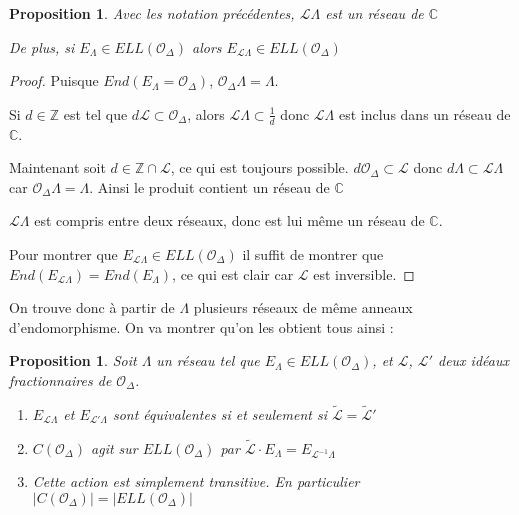 \documentclass{article}
\newcommand{\Z}[0]{\mathbb{Z}}
\newcommand{\C}[0]{\mathbb{C}}
\newcommand{\OR}[0]{\mathcal{O}}
\newcommand{\LR}[0]{\mathcal{L}}
\newcommand{\CL}[0]{\tilde{\LR}}
\newtheorem{Prop}[The]{Proposition}
\begin{document}
\begin{Prop}
	Avec les notation précédentes, $\LR\Lambda$ est un réseau de $\C$ 
	
	De plus, si $E_{\Lambda}\in ELL(\OR_{\Delta})$ alors $E_{\LR\Lambda}\in ELL(\OR_{\Delta})$
\end{Prop}

\begin{proof}
	Puisque $End(E_{\Lambda} = \OR_{\Delta})$, $\OR_{\Delta}\Lambda = \Lambda$. 
	
	Si $d\in\Z$ est tel que $d\LR\subset\OR_{\Delta}$, alors $\LR\Lambda\subset\frac{1}{d}$ donc $\LR\Lambda$ est inclus dans un réseau de $\C$. 
	
	Maintenant soit $d\in\Z\cap\LR$, ce qui est toujours possible. $d\OR_{\Delta}\subset\LR$ donc $d\Lambda\subset\LR\Lambda$ car $\OR_{\Delta}\Lambda = \Lambda$. Ainsi le produit contient un réseau de $\C$
	
	$\LR\Lambda$ est compris entre deux réseaux, donc est lui même un réseau de $\C$.
	
	Pour montrer que $E_{\LR\Lambda}\in ELL(\OR_{\Delta})$ il suffit de montrer que $End(E_{\LR\Lambda}) = End(E_{\Lambda})$, ce qui est clair car $\LR$ est inversible. 
\end{proof}

On trouve donc à partir de $\Lambda$ plusieurs réseaux de même anneaux d'endomorphisme. On va montrer qu'on les obtient tous ainsi :

\begin{Prop}
	Soit $\Lambda$ un réseau tel que $E_{\Lambda}\in ELL(\OR_{\Delta})$, et $\LR$, $\LR'$ deux idéaux fractionnaires de $\OR_{\Delta}$. 
	
	\begin{enumerate}
		\item $E_{\LR\Lambda}$ et $E_{\LR'\Lambda}$ sont équivalentes si et seulement si $\CL = \CL'$
		\item $C(\OR_{\Delta})$ agit sur $ELL(\OR_{\Delta})$ par $\CL\cdot E_{\Lambda} = E_{\LR^{-1}\Lambda}$
		\item Cette action est simplement transitive. En particulier $\left| C(\OR_{\Delta})\right| = \left| ELL(\OR_{\Delta})\right| $
	\end{enumerate}
\end{Prop}
\end{document}
